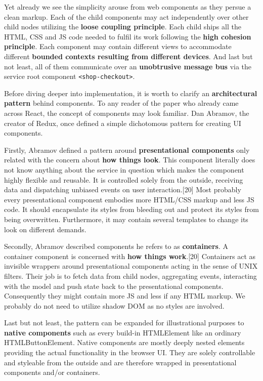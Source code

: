\documentclass[]{article}
\begin{document}
Yet already we see the simplicity arouse from web components as they
persue a clean markup. Each of the child components may act
independently over other child nodes utilizing the \textbf{loose
coupling principle}. Each child ships all the HTML, CSS and JS code
needed to fulfil its work following the \textbf{high cohesion
principle}. Each component may contain different views to accommodate
different \textbf{bounded contexts resulting from different devices}.
And last but not least, all of them communicate over an
\textbf{unobtrusive message bus} via the service root component
\texttt{\textless{}shop-checkout\textgreater{}}.

Before diving deeper into implementation, it is worth to clarify an
\textbf{architectural pattern} behind components. To any reader of the
paper who already came across React, the concept of components may look
familiar. Dan Abramov, the creator of Redux, once defined a simple
dichotomous pattern for creating UI components.

Firstly, Abramov defined a pattern around \textbf{presentational
components} only related with the concern about \textbf{how things
look}. This component literally does not know anything about the service
in question which makes the component highly flexible and reusable. It
is controlled solely from the outside, receiving data and dispatching
unbiased events on user interaction.{[}20{]} Most probably every
presentational component embodies more HTML/CSS markup and less JS code.
It should encapsulate its styles from bleeding out and protect its
styles from being overwritten. Furthermore, it may contain several
templates to change its look on different demands.

Secondly, Abramov described components he refers to as
\textbf{containers}. A container component is concerned with \textbf{how
things work}.{[}20{]} Containers act as invisible wrappers around
presentational components acting in the sense of UNIX filters. Their job
is to fetch data from child nodes, aggregating events, interacting with
the model and push state back to the presentational components.
Consequently they might contain more JS and less if any HTML markup. We
probably do not need to utilize shadow DOM as no styles are involved.

Last but not least, the pattern can be expanded for illustrational
purposes to \textbf{native components} such as every build-in
HTMLElement like an ordinary HTMLButtonElement. Native components are
mostly deeply nested elements providing the actual functionality in the
browser UI. They are solely controllable and styleable from the outside
and are therefore wrapped in presentational components and/or
containers.
\end{document}
